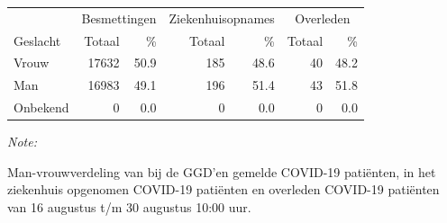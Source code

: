 \documentclass[
  english,
  man,floatsintext]{apa6}
\begin{document}
\begin{table}
\centering\begingroup\fontsize{11}{13}\selectfont

\begin{threeparttable}
\begin{tabular}{lrrrrrr}
\toprule
\multicolumn{1}{c}{ } & \multicolumn{2}{c}{Besmettingen} & \multicolumn{2}{c}{Ziekenhuisopnames} & \multicolumn{2}{c}{Overleden} \\
\cmidrule(l{3pt}r{3pt}){2-3} \cmidrule(l{3pt}r{3pt}){4-5} \cmidrule(l{3pt}r{3pt}){6-7}
Geslacht & Totaal & \% & Totaal & \% & Totaal & \%\\
\midrule
Vrouw & 17632 & 50.9 & 185 & 48.6 & 40 & 48.2\\
Man & 16983 & 49.1 & 196 & 51.4 & 43 & 51.8\\
Onbekend & 0 & 0.0 & 0 & 0.0 & 0 & 0.0\\
\bottomrule
\end{tabular}
\begin{tablenotes}
\item \textit{Note: } 
\item Man-vrouwverdeling van bij de GGD’en gemelde COVID-19 patiënten, in het ziekenhuis opgenomen COVID-19 patiënten en overleden COVID-19 patiënten van 16 augustus t/m 30 augustus 10:00 uur.
\end{tablenotes}
\end{threeparttable}
\endgroup{}
\end{table}
\newpage
\end{document}

